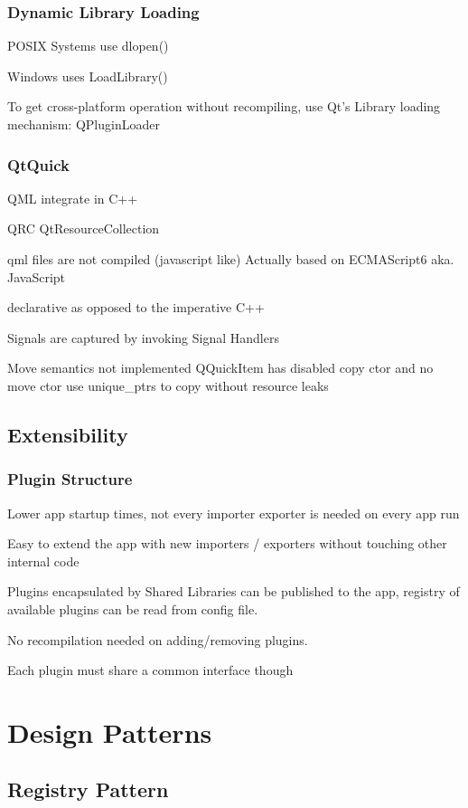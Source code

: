 \subsubsection{Dynamic Library Loading}
POSIX Systems use dlopen()

Windows uses LoadLibrary()

To get cross-platform operation without recompiling, use Qt's Library loading mechanism: QPluginLoader

\subsubsection{QtQuick}
QML integrate in C++

QRC QtResourceCollection

qml files are not compiled (javascript like)
Actually based on ECMAScript6 aka. JavaScript

declarative as opposed to the imperative  C++

Signals are captured by invoking Signal Handlers

Move semantics not implemented
QQuickItem has disabled copy ctor and no move ctor
use unique_ptrs to copy without resource leaks


\subsection{Extensibility}
\subsubsection{Plugin Structure}
Lower app startup times, not every importer exporter is needed on every app run

Easy to extend the app with new importers / exporters without touching other internal code

Plugins encapsulated by Shared Libraries can be published to the app, registry of available plugins can be read from config file.

No recompilation needed on adding/removing plugins.

Each plugin must share a common interface though

\section{Design Patterns}
\subsection{Registry Pattern}

